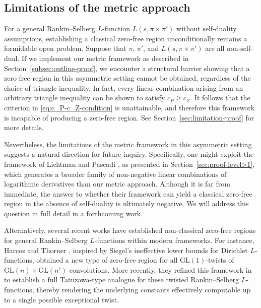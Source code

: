 \documentclass[12pt,reqno]{amsart}
\theoremstyle{remark}
\numberwithin{equation}{section}
\begin{document}
\subsection{Limitations of the metric approach}\label{subsec:limitations-intro}

For a general Rankin--Selberg $L$-function $L(s,\pi\times\pi')$ without self-duality assumptions, establishing a classical zero-free region unconditionally remains a formidable open problem. Suppose that $\pi$, $\pi'$, and $L(s,\pi\times\pi')$ are all non-self-dual. If we implement our metric framework as described in Section~\ref{subsec:outline-proof},  we encounter a structural barrier showing that a zero-free region in this asymmetric setting cannot be obtained, regardless of the choice of triangle inequality. 
In fact, every linear combination arising from an arbitrary triangle inequality can be shown to satisfy $c_P \ge c_Z$. It follows that the criterion in \eqref{eq:c_P-c_Z-condition} is unattainable, and therefore this framework is incapable of producing a zero-free region.
See Section~\ref{sec:limitation-proof} for more details.


Nevertheless, the limitations of the metric framework in this asymmetric setting suggests a natural direction for future inquiry. Specifically, one might exploit the framework of Lichtman and Pascadi \cite{LP}, as presented in Section~\ref{sec:proof-level>1}, which generates a broader family of non-negative linear combinations of logarithmic derivatives than our metric approach. Although it is far from immediate, the answer to whether their framework can yield a classical zero-free region in the absence of self-duality is ultimately negative. We will address this question in full detail in a forthcoming work.

Alternatively, several recent works have established non-classical zero-free regions for general Rankin--Selberg $L$-functions within modern frameworks. For instance, Harcos and Thorner \cite{Harcos-Thorner}, inspired by Siegel's ineffective lower bounds for Dirichlet $L$-functions, obtained a new type of zero-free region for all $\mathrm{GL}(1)$-twists of $\mathrm{GL}(n) \times \mathrm{GL}(n')$ convolutions. More recently, they refined this framework in~\cite{Tatuzawa} to establish a full Tatuzawa-type analogue for these twisted Rankin--Selberg $L$-functions, thereby rendering the underlying constants effectively computable up to a single possible exceptional twist.



	
\end{document}
